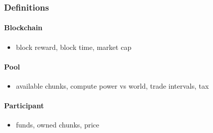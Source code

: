 \subsubsection{Definitions}

\paragraph{Blockchain}

\begin{itemize}
  \item block reward, block time, market cap
\end{itemize}

\paragraph{Pool}

\begin{itemize}
  \item available chunks, compute power vs world, trade intervals, tax
\end{itemize}

\paragraph{Participant}

\begin{itemize}
  \item funds, owned chunks, price
\end{itemize}
